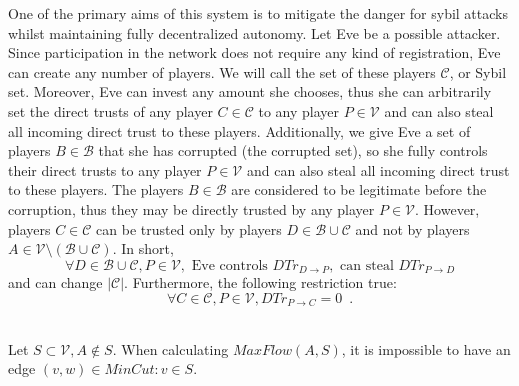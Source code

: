 \documentclass[11pt]{llncs}
\begin{document}
    One of the primary aims of this system is to mitigate the danger for sybil attacks whilst maintaining fully decentralized
    autonomy. Let Eve be a possible attacker. Since participation in the network does not require any kind of registration,
    Eve can create any number of players. We will call the set of these players $\mathcal{C}$, or Sybil set. Moreover, Eve
    can invest any amount she chooses, thus she can arbitrarily set the direct trusts of any player $C \in \mathcal{C}$ to
    any player $P \in \mathcal{V}$ and can also steal all incoming direct trust to these players. Additionally, we give Eve a
    set of players $B \in \mathcal{B}$ that she has corrupted (the corrupted set), so she fully controls their direct trusts
    to any player $P \in \mathcal{V}$ and can also steal all incoming direct trust to these players. The players $B \in
    \mathcal{B}$ are considered to be legitimate before the corruption, thus they may be directly trusted by any player $P
    \in \mathcal{V}$. However, players $C \in \mathcal{C}$ can be trusted only by players $D \in \mathcal{B} \cup
    \mathcal{C}$ and not by players $A \in \mathcal{V} \setminus (\mathcal{B} \cup \mathcal{C})$. In short,
    \begin{equation}
      \forall D \in \mathcal{B} \cup \mathcal{C}, P \in \mathcal{V}, \mbox{ Eve controls } DTr_{D \rightarrow P}, \mbox{ can
      steal } DTr_{P \rightarrow D}
    \end{equation}
    and can change $|\mathcal{C}|$. Furthermore, the following restriction true:
    \begin{equation}
       \forall C \in \mathcal{C}, P \in \mathcal{V}, DTr_{P \rightarrow C} = 0 \enspace.
    \end{equation}
    \begin{lemma} \ \\
       \label{mincutmany}
       Let $S \subset \mathcal{V}, A \notin S$. When calculating $MaxFlow\left(A, S\right)$, it is impossible to have an edge
       $\left(v, w\right) \in MinCut : v \in S$.
    \end{lemma}
\end{document}
